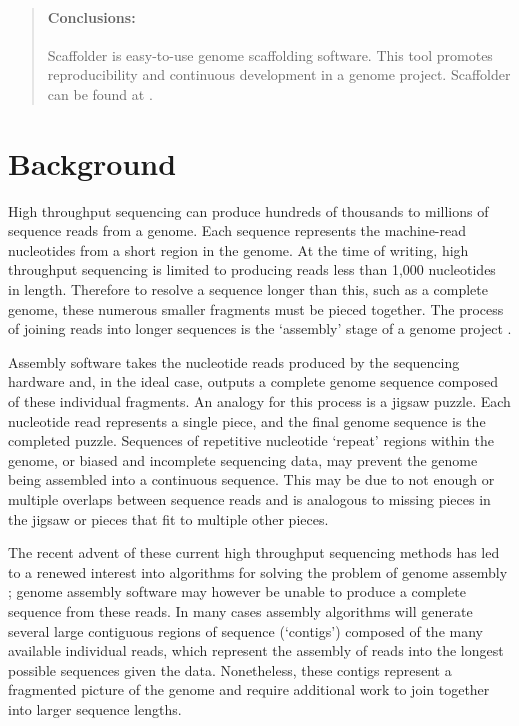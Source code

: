 \documentclass[10pt]{bmc_article}
\newenvironment{bmcformat}{\begin{raggedright}\baselineskip20pt\sloppy\setboolean{publ}{false}}{\end{raggedright}\baselineskip20pt\sloppy}
\begin{document}
\begin{bmcformat}
\begin{abstract}
  \paragraph*{Conclusions:} Scaffolder is easy-to-use genome scaffolding
  software. This tool promotes reproducibility and continuous development in a
  genome project. Scaffolder can be found at \scaffolder.

\end{abstract}


\clearpage

\section*{Background} %

High throughput sequencing can produce hundreds of thousands to millions of
sequence reads from a genome. Each sequence represents the machine-read
nucleotides from a short region in the genome. At the time of writing, high
throughput sequencing is limited to producing reads less than 1,000 nucleotides
in length. Therefore to resolve a sequence longer than this, such as a complete
genome, these numerous smaller fragments must be pieced together. The process
of joining reads into longer sequences is the `assembly' stage of a genome
project \cite{miller2010}. \pb

Assembly software takes the nucleotide reads produced by the sequencing
hardware and, in the ideal case, outputs a complete genome sequence composed of
these individual fragments. An analogy for this process is a jigsaw puzzle.
Each nucleotide read represents a single piece, and the final genome sequence
is the completed puzzle. Sequences of repetitive nucleotide `repeat' regions
within the genome, or biased and incomplete sequencing data, may prevent the
genome being assembled into a continuous sequence. This may be due to not
enough or multiple overlaps between sequence reads and is analogous to missing
pieces in the jigsaw or pieces that fit to multiple other pieces. \pb

The recent advent of these current high throughput sequencing methods has led
to a renewed interest into algorithms for solving the problem of genome
assembly \cite{pop2008,pop2009}; genome assembly software may however be unable
to produce a complete sequence from these reads. In many cases assembly
algorithms will generate several large contiguous regions of sequence
(`contigs') composed of the many available individual reads, which represent
the assembly of reads into the longest possible sequences given the data.
Nonetheless, these contigs represent a fragmented picture of the genome and
require additional work to join together into larger sequence lengths. \pb


\end{bmcformat}
\end{document}
